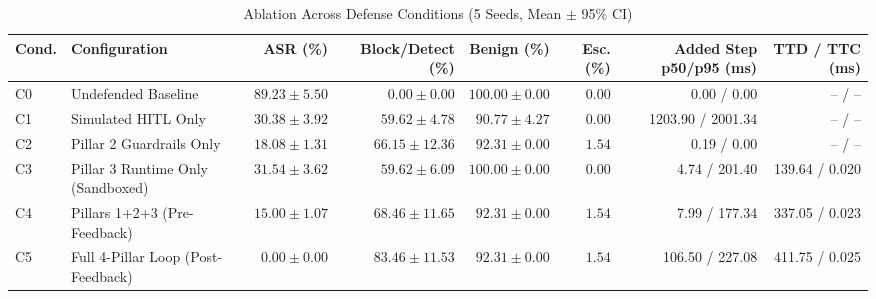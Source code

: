\begin{table}[t]
\centering
\caption{Ablation Across Defense Conditions (5 Seeds, Mean $\pm$ 95\% CI)}
\begin{tabular}{llrrrrrr}
\toprule
Cond. & Configuration & ASR (\%) & Block/Detect (\%) & Benign (\%) & Esc. (\%) & Added Step p50/p95 (ms) & TTD / TTC (ms) \\
\midrule
C0 & Undefended Baseline & $89.23 \pm 5.50$ & $0.00 \pm 0.00$ & $100.00 \pm 0.00$ & $0.00$ & 0.00 / 0.00 & -- / -- \\
C1 & Simulated HITL Only & $30.38 \pm 3.92$ & $59.62 \pm 4.78$ & $90.77 \pm 4.27$ & $0.00$ & 1203.90 / 2001.34 & -- / -- \\
C2 & Pillar 2 Guardrails Only & $18.08 \pm 1.31$ & $66.15 \pm 12.36$ & $92.31 \pm 0.00$ & $1.54$ & 0.19 / 0.00 & -- / -- \\
C3 & Pillar 3 Runtime Only (Sandboxed) & $31.54 \pm 3.62$ & $59.62 \pm 6.09$ & $100.00 \pm 0.00$ & $0.00$ & 4.74 / 201.40 & 139.64 / 0.020 \\
C4 & Pillars 1+2+3 (Pre-Feedback) & $15.00 \pm 1.07$ & $68.46 \pm 11.65$ & $92.31 \pm 0.00$ & $1.54$ & 7.99 / 177.34 & 337.05 / 0.023 \\
C5 & Full 4-Pillar Loop (Post-Feedback) & $0.00 \pm 0.00$ & $83.46 \pm 11.53$ & $92.31 \pm 0.00$ & $1.54$ & 106.50 / 227.08 & 411.75 / 0.025 \\
\bottomrule
\end{tabular}
\end{table}
